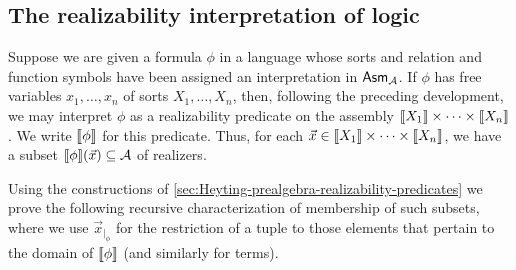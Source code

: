 \subsection{The realizability interpretation of logic}\label{sec:realizability-interpretation}

Suppose we are given a formula \(\phi\) in a language whose sorts and relation
and function symbols have been assigned an interpretation in \(\mathsf{Asm}_{\mathcal A}\).
%
If \(\phi\) has free variables \(x_1,\dots,x_n\) of sorts \(X_1,\dots,X_n\),
then, following the preceding development, we may interpret \(\phi\) as a
realizability predicate on the assembly \(\llbracket X_1\rrbracket \times \cdots\times \llbracket X_n\rrbracket\).
%
We write \(\llbracket\phi\rrbracket\) for this predicate. Thus, for each
\(\vec x \in \llbracket X_1\rrbracket\times\cdots\times\llbracket X_n\rrbracket\), we have a subset
\(\llbracket\phi\rrbracket(\vec x) \subseteq \mathcal A\) of realizers.

Using the constructions of
\cref{sec:Heyting-prealgebra-realizability-predicates} we prove the following
recursive characterization of membership of such subsets, where we use
\(\vec x_{|_\phi}\) for the restriction of a tuple to those elements that
pertain to the domain of \(\llbracket\phi\rrbracket\) (and similarly for terms).

